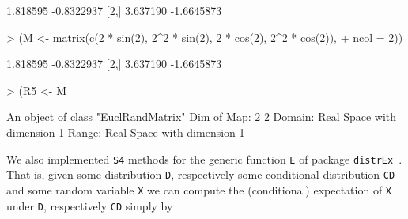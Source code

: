 \documentclass[11pt]{article}
\begin{document}
\begin{Schunk}
\begin{Soutput}
         [,1]       [,2]
[1,] 1.818595 -0.8322937
[2,] 3.637190 -1.6645873
\end{Soutput}
\begin{Sinput}
> (M <- matrix(c(2 * sin(2), 2^2 * sin(2), 2 * cos(2), 2^2 * cos(2)), 
+     ncol = 2))
\end{Sinput}
\begin{Soutput}
         [,1]       [,2]
[1,] 1.818595 -0.8322937
[2,] 3.637190 -1.6645873
\end{Soutput}
\begin{Sinput}
> (R5 <- M %
\end{Sinput}
\begin{Soutput}
An object of class "EuclRandMatrix" 
Dim of Map:	 2 2 
Domain:	Real Space with dimension 1 
Range:	Real Space with dimension 1 
\end{Soutput}
\end{Schunk}
We also implemented {\tt S4} methods for the generic function {\tt E} of 
package {\tt distrEx}~\cite{distr}. That is, given some distribution {\tt D}, 
respectively some conditional distribution {\tt CD} and some random variable {\tt X}
we can compute the (conditional) expectation of {\tt X} under {\tt D}, respectively 
{\tt CD} simply by
\end{document}
